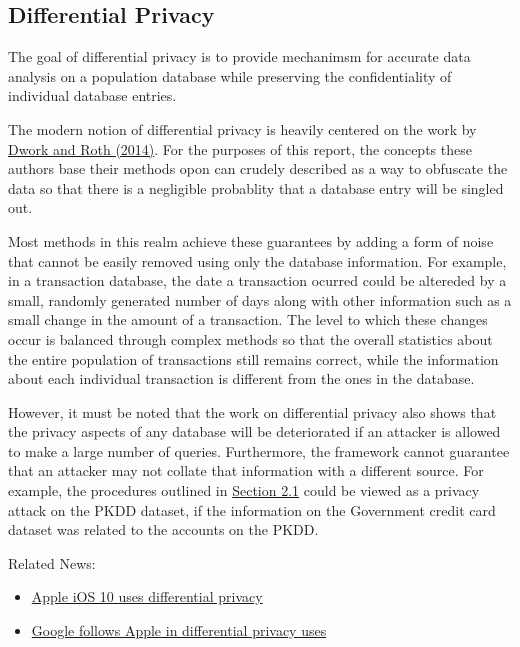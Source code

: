 \documentclass[]{article}
\begin{document}
\subsection{Differential Privacy}\label{differential-privacy}

The goal of differential privacy is to provide mechanimsm for accurate
data analysis on a population database while preserving the
confidentiality of individual database entries.

The modern notion of differential privacy is heavily centered on the
work by
\href{https://www.cis.upenn.edu/~aaroth/Papers/privacybook.pdf}{Dwork
and Roth (2014)}. For the purposes of this report, the concepts these
authors base their methods opon can crudely described as a way to
obfuscate the data so that there is a negligible probablity that a
database entry will be singled out.

Most methods in this realm achieve these guarantees by adding a form of
noise that cannot be easily removed using only the database information.
For example, in a transaction database, the date a transaction ocurred
could be altereded by a small, randomly generated number of days along
with other information such as a small change in the amount of a
transaction. The level to which these changes occur is balanced through
complex methods so that the overall statistics about the entire
population of transactions still remains correct, while the information
about each individual transaction is different from the ones in the
database.

However, it must be noted that the work on differential privacy also
shows that the privacy aspects of any database will be deteriorated if
an attacker is allowed to make a large number of queries. Furthermore,
the framework cannot guarantee that an attacker may not collate that
information with a different source. For example, the procedures
outlined in \href{sec-fusion-completition}{Section 2.1} could be viewed
as a privacy attack on the PKDD dataset, if the information on the
Government credit card dataset was related to the accounts on the PKDD.

Related News:

\begin{itemize}
\tightlist
\item 
    \href{https://www.theverge.com/2016/6/17/11957782/apple-differential-privacy-ios-10-wwdc-2016}{Apple
iOS 10 uses differential privacy}
\item
  \href{https://venturebeat.com/2017/04/06/following-apple-google-tests-differential-privacy-in-gboard-for-android/}{Google
  follows Apple in differential privacy uses}
\end{itemize}
\end{document}
